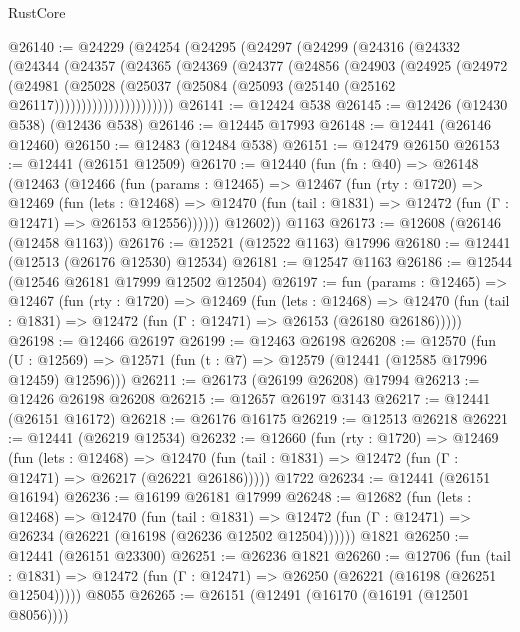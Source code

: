 \begin{lexlean}{RustCore}
\begin{coremodule}
@26140 := @24229
    (@24254
      (@24295
        (@24297
          (@24299
            (@24316
              (@24332
                (@24344
                  (@24357
                    (@24365
                      (@24369
                        (@24377
                          (@24856
                            (@24903
                              (@24925
                                (@24972
                                  (@24981
                                    (@25028
                                      (@25037
                                        (@25084 (@25093 (@25140 (@25162 @26117))))))))))))))))))))))
@26141 := @12424 @538
@26145 := @12426 (@12430 @538) (@12436 @538)
@26146 := @12445 @17993
@26148 := @12441 (@26146 @12460)
@26150 := @12483 (@12484 @538)
@26151 := @12479 @26150
@26153 := @12441 (@26151 @12509)
@26170 := @12440
    (fun (fn : @40) =>
    @26148
      (@12463
        (@12466
          (fun (params : @12465) =>
          @12467
            (fun (rty : @1720) =>
            @12469
              (fun (lets : @12468) =>
              @12470 (fun (tail : @1831) => @12472 (fun (Γ : @12471) => @26153 @12556))))))
        @12602))
    @1163
@26173 := @12608 (@26146 (@12458 @1163))
@26176 := @12521 (@12522 @1163) @17996
@26180 := @12441 (@12513 (@26176 @12530) @12534)
@26181 := @12547 @1163
@26186 := @12544 (@12546 @26181 @17999 @12502 @12504)
@26197 := fun (params : @12465) =>
  @12467
    (fun (rty : @1720) =>
    @12469
      (fun (lets : @12468) =>
      @12470 (fun (tail : @1831) => @12472 (fun (Γ : @12471) => @26153 (@26180 @26186)))))
@26198 := @12466 @26197
@26199 := @12463 @26198
@26208 := @12570
    (fun (U : @12569) => @12571 (fun (t : @7) => @12579 (@12441 (@12585 @17996 @12459) @12596)))
@26211 := @26173 (@26199 @26208) @17994
@26213 := @12426 @26198 @26208
@26215 := @12657 @26197 @3143
@26217 := @12441 (@26151 @16172)
@26218 := @26176 @16175
@26219 := @12513 @26218
@26221 := @12441 (@26219 @12534)
@26232 := @12660
    (fun (rty : @1720) =>
    @12469
      (fun (lets : @12468) =>
      @12470 (fun (tail : @1831) => @12472 (fun (Γ : @12471) => @26217 (@26221 @26186)))))
    @1722
@26234 := @12441 (@26151 @16194)
@26236 := @16199 @26181 @17999
@26248 := @12682
    (fun (lets : @12468) =>
    @12470
      (fun (tail : @1831) =>
      @12472 (fun (Γ : @12471) => @26234 (@26221 (@16198 (@26236 @12502 @12504))))))
    @1821
@26250 := @12441 (@26151 @23300)
@26251 := @26236 @1821
@26260 := @12706
    (fun (tail : @1831) => @12472 (fun (Γ : @12471) => @26250 (@26221 (@16198 (@26251 @12504)))))
    @8055
@26265 := @26151 (@12491 (@16170 (@16191 (@12501 @8056))))

\end{coremodule}
\end{lexlean}
